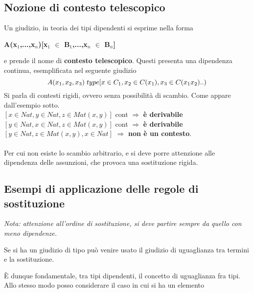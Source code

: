 \subsection{Nozione di contesto telescopico}
\label{subsec:contesto-telescopico}
Un giudizio, in teoria dei tipi dipendenti si esprime nella forma
\begin{center}\textbf{A(x$_1$,...,x$_n$)[x$_1$ $\in$ B$_1$,...,x$_n$ $\in$ B$_n$]}\end{center}
e prende il nome di \textbf{contesto telescopico}.
Questi presenta una dipendenza continua, esemplificata nel seguente giudizio
\[A(x_1,x_2,x_3)\hspace{0.1cm}type[x \in C_1, x_2 \in C(x_1), x_3 \in C(x_1 x_2)..)\]
Si parla di contesti rigidi, ovvero senza possibilit\`a di scambio. Come appare dall'esempio sotto. \\
$[x \in Nat, y \in Nat, z \in Mat(x,y)]$ cont  $\Rightarrow$ \textbf{\`e derivabile}\\
$[y \in Nat, x \in Nat, z \in Mat(x,y)]$ cont $\Rightarrow$ \textbf{\`e derivabile}\\
$[y \in Nat, z \in Mat(x,y), x \in Nat]$ $\Rightarrow$ \textbf{non \`e un contesto}. \\\\ Per cui non esiste lo scambio arbitrario, e si deve porre attenzione alle dipendenza delle assunzioni, che provoca una sostituzione rigida.
\subsection{Esempi di applicazione delle regole di sostituzione}
\label{subsec:esempi-di-applicazione}
\textit{Nota: attenzione all'ordine di sostituzione, si deve partire sempre da quello con meno dipendenze.}
\begin{prooftree}
\end{prooftree}

\begin{prooftree}
\end{prooftree}
Se si ha un giudizio di tipo pu\`o venire usato il giudizio di uguaglianza tra termini e la sostituzione.
\begin{prooftree}
\end{prooftree}
\noindent
\`E dunque fondamentale, tra tipi dipendenti, il concetto di uguaglianza fra tipi. \\Allo stesso modo posso considerare il caso in cui si ha un elemento

